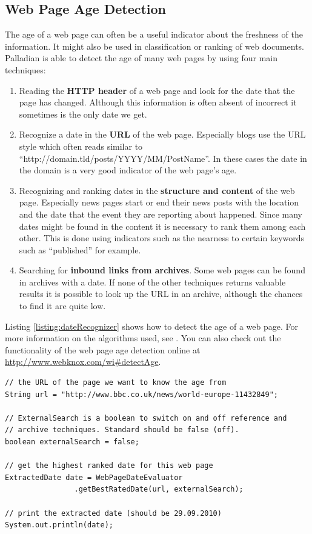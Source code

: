 \documentclass[a4paper,twoside]{book}      %
\begin{document}
\subsection{Web Page Age Detection}
The age of a web page can often be a useful indicator about the freshness of the information. It might also be used in classification or ranking of web documents. Palladian is able to detect the age of many web pages by using four main techniques:
\begin{enumerate}
\item Reading the \textbf{ HTTP header} of a web page and look for the date that the page has changed. Although this information is often absent of incorrect it sometimes is the only date we get.
\item Recognize a date in the \textbf{ URL} of the web page. Especially blogs use the URL style which often reads similar to ``http://domain.tld/posts/YYYY/MM/PostName''. In these cases the date in the domain is a very good indicator of the web page's age.
\item Recognizing and ranking dates in the \textbf{ structure and content} of the web page. Especially news pages start or end their news posts with the location and the date that the event they are reporting about happened. Since many dates might be found in the content it is necessary to rank them among each other. This is done using indicators such as the nearness to certain keywords such as ``published'' for example.
\item Searching for \textbf{ inbound links from archives}. Some web pages can be found in archives with a date. If none of the other techniques returns valuable results it is possible to look up the URL in an archive, although the chances to find it are quite low.
\end{enumerate}

Listing \ref{listing:dateRecognizer} shows how to detect the age of a web page. For more information on the algorithms used, see \cite{gregor2010bachelor}. You can also check out the functionality of the web page age detection online at \url{http://www.webknox.com/wi#detectAge}.

\begin{codelisting}
\begin{lstlisting}[label=listing:dateRecognizer,caption=Detecting the age of a web page.,frame=tb]
// the URL of the page we want to know the age from
String url = "http://www.bbc.co.uk/news/world-europe-11432849";

// ExternalSearch is a boolean to switch on and off reference and
// archive techniques. Standard should be false (off).
boolean externalSearch = false;

// get the highest ranked date for this web page
ExtractedDate date = WebPageDateEvaluator
				.getBestRatedDate(url, externalSearch);

// print the extracted date (should be 29.09.2010)
System.out.println(date);
\end{lstlisting}
\end{codelisting}
\end{document}
